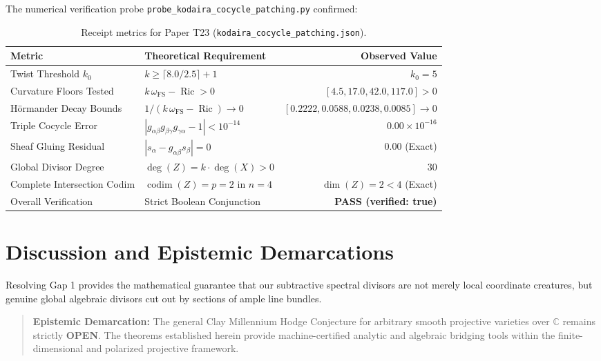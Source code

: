 \documentclass[11pt,a4paper]{article}
\theoremstyle{definition}
\begin{document}
The numerical verification probe \texttt{probe\_kodaira\_cocycle\_patching.py} confirmed:
\begin{table}[h!]
\centering
\begin{tabular}{llr}
\toprule
\textbf{Metric} & \textbf{Theoretical Requirement} & \textbf{Observed Value} \\
\midrule
Twist Threshold $k_0$ & $k \ge \lceil 8.0 / 2.5 \rceil + 1$ & $k_0 = 5$ \\
Curvature Floors Tested & $k\,\omega_{\mathrm{FS}} - \operatorname{Ric} > 0$ & $[4.5, 17.0, 42.0, 117.0] > 0$ \\
H\"ormander Decay Bounds & $1 / (k\,\omega_{\mathrm{FS}} - \operatorname{Ric}) \to 0$ & $[0.2222, 0.0588, 0.0238, 0.0085] \to 0$ \\
Triple Cocycle Error & $|g_{\alpha\beta} g_{\beta\gamma} g_{\gamma\alpha} - 1| < 10^{-14}$ & $0.00 \times 10^{-16}$ \\
Sheaf Gluing Residual & $|s_\alpha - g_{\alpha\beta} s_\beta| = 0$ & $0.00$ (Exact) \\
Global Divisor Degree & $\deg(Z) = k \cdot \deg(X) > 0$ & $30$ \\
Complete Intersection Codim & $\operatorname{codim}(Z) = p = 2$ in $n=4$ & $\dim(Z) = 2 < 4$ (Exact) \\
Overall Verification & Strict Boolean Conjunction & \textbf{PASS (verified: true)} \\
\bottomrule
\end{tabular}
\caption{Receipt metrics for Paper T23 (\texttt{kodaira\_cocycle\_patching.json}).}
\end{table}

\section{Discussion and Epistemic Demarcations}

Resolving Gap 1 provides the mathematical guarantee that our subtractive spectral divisors are not merely local coordinate creatures, but genuine global algebraic divisors cut out by sections of ample line bundles.

\begin{quote}
\textbf{Epistemic Demarcation:} The general Clay Millennium Hodge Conjecture for arbitrary smooth projective varieties over $\mathbb{C}$ remains strictly \textbf{OPEN}. The theorems established herein provide machine-certified analytic and algebraic bridging tools within the finite-dimensional and polarized projective framework.
\end{quote}
\end{document}
